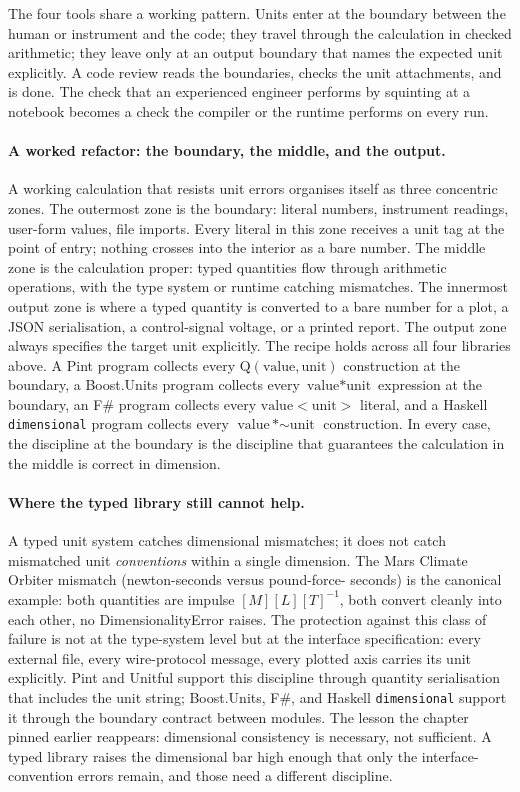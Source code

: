 The four tools share a working pattern. Units enter at the boundary
between the human or instrument and the code; they travel through
the calculation in checked arithmetic; they leave only at an
output boundary that names the expected unit explicitly. A code
review reads the boundaries, checks the unit attachments, and is
done. The check that an experienced engineer performs by squinting
at a notebook becomes a check the compiler or the runtime performs
on every run.

\paragraph{A worked refactor: the boundary, the middle, and the
output.} A working calculation that resists unit errors organises
itself as three concentric zones. The outermost zone is the
boundary: literal numbers, instrument readings, user-form values,
file imports. Every literal in this zone receives a unit tag at
the point of entry; nothing crosses into the interior as a bare
number. The middle zone is the calculation proper: typed
quantities flow through arithmetic operations, with the type
system or runtime catching mismatches. The innermost output zone
is where a typed quantity is converted to a bare number for a
plot, a JSON serialisation, a control-signal voltage, or a printed
report. The output zone always specifies the target unit
explicitly. The recipe holds across all four libraries above.
A Pint program collects every $\text{Q}(\text{value}, \text{unit})$
construction at the boundary, a Boost.Units program collects every
$\text{value} * \text{unit}$ expression at the boundary, an F\#
program collects every $\text{value}<\text{unit}>$ literal, and a
Haskell \texttt{dimensional} program collects every
$\text{value} \,\text{*}{\sim} \text{unit}$ construction. In every
case, the discipline at the boundary is the discipline that
guarantees the calculation in the middle is correct in dimension.

\paragraph{Where the typed library still cannot help.} A typed
unit system catches dimensional mismatches; it does not catch
mismatched unit \emph{conventions} within a single dimension. The
Mars Climate Orbiter mismatch (newton-seconds versus pound-force-
seconds) is the canonical example: both quantities are impulse
$[M][L][T]^{-1}$, both convert cleanly into each other, no
DimensionalityError raises. The protection against this class of
failure is not at the type-system level but at the interface
specification: every external file, every wire-protocol message,
every plotted axis carries its unit explicitly. Pint and Unitful
support this discipline through quantity serialisation that
includes the unit string; Boost.Units, F\#, and Haskell
\texttt{dimensional} support it through the boundary contract
between modules. The lesson the chapter pinned earlier reappears:
dimensional consistency is necessary, not sufficient. A typed
library raises the dimensional bar high enough that only the
interface-convention errors remain, and those need a different
discipline.

